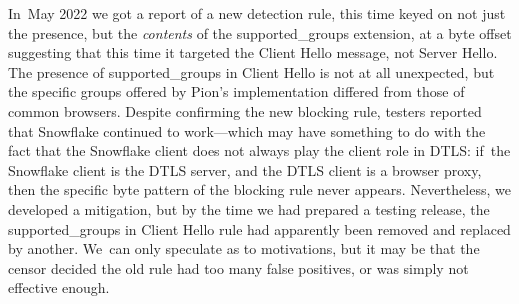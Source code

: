 \documentclass[letterpaper,twocolumn]{article}
\begin{document}
In~May 2022 we got a report of a new detection rule,
this time keyed on not just the presence, but the \emph{contents}
of the \mbox{supported\_groups} extension,
at a byte offset suggesting that this time
it targeted the Client Hello message,
not Server Hello.
The presence of \mbox{supported\_groups} in Client Hello is not at all unexpected,
but the specific groups offered by Pion's implementation
differed from those of common browsers.
Despite confirming the new blocking rule,
testers reported that Snowflake continued to work---which
may have something to do with the fact that the Snowflake client
does not always play the client role in DTLS:
if~the Snowflake client is the DTLS server,
and the DTLS client is a browser proxy,
then the specific byte pattern of the blocking rule never appears.
Nevertheless, we developed a mitigation,
but by the time we had prepared a testing release,
the \mbox{supported\_groups} in Client Hello rule
had apparently been removed
and replaced by another.
We~can only speculate as to motivations,
but it may be that the censor decided the old rule
had too many false positives,
or was simply not effective enough.

\end{document}
